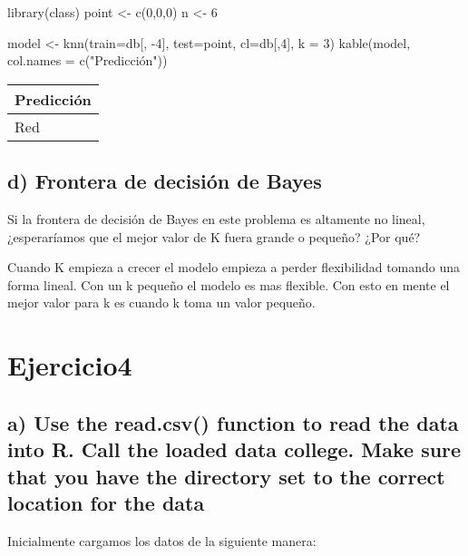 \documentclass[
  12pt,
  letterpaper,
]{article}
\newenvironment{Shaded}{\begin{snugshade}}{\end{snugshade}}
\newcommand{\AttributeTok}[1]{\textcolor[rgb]{0.77,0.63,0.00}{#1}}
\newcommand{\DecValTok}[1]{\textcolor[rgb]{0.00,0.00,0.81}{#1}}
\newcommand{\FunctionTok}[1]{\textcolor[rgb]{0.00,0.00,0.00}{#1}}
\newcommand{\NormalTok}[1]{#1}
\newcommand{\OtherTok}[1]{\textcolor[rgb]{0.56,0.35,0.01}{#1}}
\newcommand{\SpecialCharTok}[1]{\textcolor[rgb]{0.00,0.00,0.00}{#1}}
\newcommand{\StringTok}[1]{\textcolor[rgb]{0.31,0.60,0.02}{#1}}
\begin{document}
\begin{Shaded}
\begin{Highlighting}[]
\FunctionTok{library}\NormalTok{(class)}
\NormalTok{point }\OtherTok{\textless{}{-}} \FunctionTok{c}\NormalTok{(}\DecValTok{0}\NormalTok{,}\DecValTok{0}\NormalTok{,}\DecValTok{0}\NormalTok{)}
\NormalTok{n }\OtherTok{\textless{}{-}} \DecValTok{6} 

\NormalTok{model }\OtherTok{\textless{}{-}} \FunctionTok{knn}\NormalTok{(}\AttributeTok{train=}\NormalTok{db[, }\SpecialCharTok{{-}}\DecValTok{4}\NormalTok{], }\AttributeTok{test=}\NormalTok{point, }\AttributeTok{cl=}\NormalTok{db[,}\DecValTok{4}\NormalTok{], }\AttributeTok{k =} \DecValTok{3}\NormalTok{) }
\FunctionTok{kable}\NormalTok{(model, }\AttributeTok{col.names =} \FunctionTok{c}\NormalTok{(}\StringTok{"Predicción"}\NormalTok{))}
\end{Highlighting}
\end{Shaded}

\begin{tabular}{l}
\hline
Predicción\\
\hline
Red\\
\hline
\end{tabular}

\subsection{d) Frontera de decisión de Bayes}

Si la frontera de decisión de Bayes en este problema es altamente no
lineal, ¿esperaríamos que el mejor valor de K fuera grande o pequeño?
¿Por qué?

Cuando K empieza a crecer el modelo empieza a perder flexibilidad
tomando una forma lineal. Con un k pequeño el modelo es mas flexible.
Con esto en mente el mejor valor para k es cuando k toma un valor
pequeño.

\section{Ejercicio4}

\subsection{a) Use the read.csv() function to read the data into R. Call the loaded data college. Make sure that you have the directory set to the correct location for the data}

Inicialmente cargamos los datos de la siguiente manera:
\end{document}
